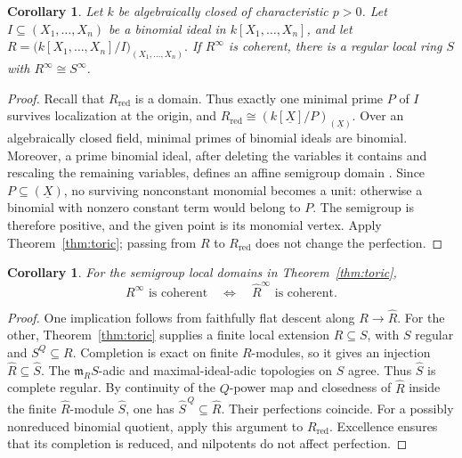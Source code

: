 \documentclass[11pt,a4paper]{amsart}
\numberwithin{equation}{section}
\newtheorem{corollary}[theorem]{Corollary}
\begin{document}
 
 \begin{corollary}
 \label{cor:binomial}
 Let $k$ be algebraically closed of characteristic $p>0$.	Let $I\subseteq (X_1,\ldots,X_n)$ be a binomial ideal in
 	$k[X_1,\ldots,X_n]$, and let
 $R=\bigl(k[X_1,\ldots,X_n]/I\bigr)_{(X_1,\ldots,X_n)}.$	If $R^\infty$ is coherent, there is a regular local ring $S$
 	with $R^\infty\cong S^\infty$.

 \end{corollary}
 
 \begin{proof}
 Recall that $R_{\mathrm{red}}$ is a domain. Thus exactly one	minimal prime $P$ of $I$ survives localization at the origin,	and $R_{\mathrm{red}}\cong(k[\underline{X}]/P)_{(\underline{X})}$.	Over an algebraically closed field, minimal primes of binomial	ideals are binomial. Moreover, a prime binomial ideal, after deleting	the variables it contains and rescaling the remaining variables,	defines an affine semigroup domain \cite{ES}.	Since $P\subseteq(\underline{X})$, no surviving nonconstant monomial becomes 	a unit: otherwise a binomial with nonzero constant term would 	belong to $P$.	The semigroup is therefore positive, and the given point is its 	monomial vertex. Apply Theorem~\ref{thm:toric}; passing from $R$ 	to $R_{\mathrm{red}}$ does not change the perfection.
 \end{proof}
 
 \begin{corollary}\label{cor:completion}	For the semigroup local domains in Theorem~\ref{thm:toric},	$$
 	R^\infty\text{ is coherent}
 	\quad\Longleftrightarrow\quad
 	\widehat R^\infty\text{ is coherent}.	$$
 \end{corollary}
 
 \begin{proof}	One implication follows from faithfully flat descent along	$R\to\widehat R$.	For the other, Theorem~\ref{thm:toric} supplies a finite local	extension $R\subseteq S$, with $S$ regular and $S^Q\subseteq R$.	Completion is exact on finite $R$-modules, so it gives an injection
$	\widehat R\subseteq\widehat S.$	The $\mathfrak m_RS$-adic and maximal-ideal-adic topologies on	$S$ agree. Thus $\widehat S$ is complete regular.	By continuity of the $Q$-power map and closedness of	$\widehat R$ inside the finite $\widehat R$-module $\widehat S$,	one has $\widehat S^{\,Q}\subseteq\widehat R$.	Their perfections coincide.	For a possibly nonreduced binomial quotient, apply this argument to	$R_{\mathrm{red}}$. Excellence ensures that its completion is
reduced, and nilpotents do not affect perfection.
 \end{proof}
 
\end{document}
